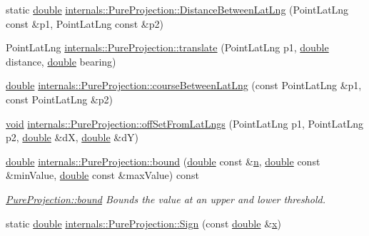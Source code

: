 \begin{DoxyCompactItemize}
\item 
static \hyperlink{_super_l_u_support_8h_a8956b2b9f49bf918deed98379d159ca7}{double} \hyperlink{group___o_p_map_widget_ga2dd7d98a1173081e9e81f2acb088f382}{internals\-::\-Pure\-Projection\-::\-Distance\-Between\-Lat\-Lng} (Point\-Lat\-Lng const \&p1, Point\-Lat\-Lng const \&p2)
\item 
Point\-Lat\-Lng \hyperlink{group___o_p_map_widget_gae41a7a74d45f66fa61c622f0838827ae}{internals\-::\-Pure\-Projection\-::translate} (Point\-Lat\-Lng p1, \hyperlink{_super_l_u_support_8h_a8956b2b9f49bf918deed98379d159ca7}{double} distance, \hyperlink{_super_l_u_support_8h_a8956b2b9f49bf918deed98379d159ca7}{double} bearing)
\item 
\hyperlink{_super_l_u_support_8h_a8956b2b9f49bf918deed98379d159ca7}{double} \hyperlink{group___o_p_map_widget_ga2b6a72edc701752748d62a513aea828b}{internals\-::\-Pure\-Projection\-::course\-Between\-Lat\-Lng} (const Point\-Lat\-Lng \&p1, const Point\-Lat\-Lng \&p2)
\item 
\hyperlink{group___u_a_v_objects_plugin_ga444cf2ff3f0ecbe028adce838d373f5c}{void} \hyperlink{group___o_p_map_widget_gaa4efe3b7598311215c44e7a0f47df531}{internals\-::\-Pure\-Projection\-::off\-Set\-From\-Lat\-Lngs} (Point\-Lat\-Lng p1, Point\-Lat\-Lng p2, \hyperlink{_super_l_u_support_8h_a8956b2b9f49bf918deed98379d159ca7}{double} \&d\-X, \hyperlink{_super_l_u_support_8h_a8956b2b9f49bf918deed98379d159ca7}{double} \&d\-Y)
\item 
\hyperlink{_super_l_u_support_8h_a8956b2b9f49bf918deed98379d159ca7}{double} \hyperlink{group___o_p_map_widget_ga0a978f088a3c28b59ce7bdf4ac3ab238}{internals\-::\-Pure\-Projection\-::bound} (\hyperlink{_super_l_u_support_8h_a8956b2b9f49bf918deed98379d159ca7}{double} const \&\hyperlink{glext_8h_a4eacae1d9e7c39f8236bb36d4ececa77}{n}, \hyperlink{_super_l_u_support_8h_a8956b2b9f49bf918deed98379d159ca7}{double} const \&min\-Value, \hyperlink{_super_l_u_support_8h_a8956b2b9f49bf918deed98379d159ca7}{double} const \&max\-Value) const 
\begin{DoxyCompactList}\small\item\em \hyperlink{group___o_p_map_widget_ga0a978f088a3c28b59ce7bdf4ac3ab238}{Pure\-Projection\-::bound} Bounds the value at an upper and lower threshold. \end{DoxyCompactList}\item 
static \hyperlink{_super_l_u_support_8h_a8956b2b9f49bf918deed98379d159ca7}{double} \hyperlink{group___o_p_map_widget_gaee27ced7a956221b25376a3a66d24225}{internals\-::\-Pure\-Projection\-::\-Sign} (const \hyperlink{_super_l_u_support_8h_a8956b2b9f49bf918deed98379d159ca7}{double} \&\hyperlink{glext_8h_a1db9d104e3c2128177f26aff7b46982f}{x})

\end{DoxyCompactItemize}

